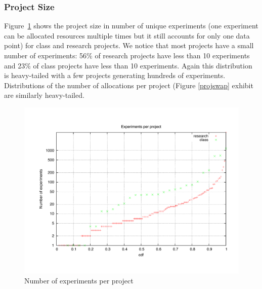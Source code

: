 \documentclass[10pt]{article}
\begin{document}
\subsubsection{Project Size}
Figure~\ref{projsize} shows the project size in number of unique
experiments (one experiment can be allocated resources multiple times but it
still accounts for only one data point) for class and research projects.
We notice that most projects have a small number of experiments: 56\% of
research projects have less than 10 experiments and 23\% of class
projects have less than 10 experiments. Again this distribution is
heavy-tailed with a few projects generating hundreds of experiments.
Distributions of the number of allocations per project (Figure
\ref{projswap} exhibit are similarly heavy-tailed.

\begin{figure}[htbp]
\begin{center}
\includegraphics[width=5in]{figs/projsize.pdf}
\caption{Number of experiments per project}
\label{projsize}
\end{center}
\end{figure}
\end{document}

